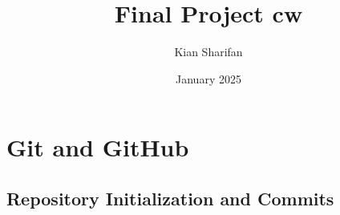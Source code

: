 \documentclass{article}
\title{Final Project cw}
\author{Kian Sharifan}
\date{January 2025}
\begin{document}
\maketitle
\newpage
\tableofcontents
\newpage

\section{Git and GitHub}
\subsection{Repository Initialization and Commits}
\end{document}
